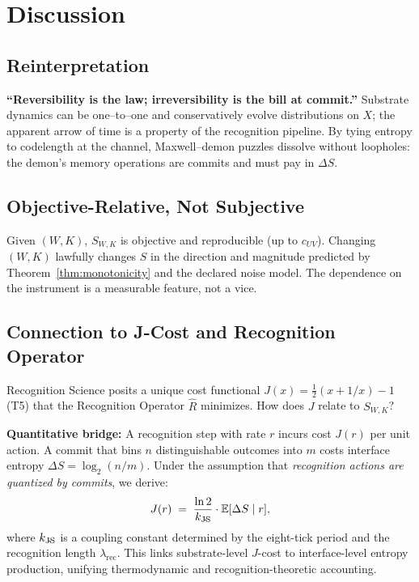 \documentclass[11pt,letterpaper]{article}
\theoremstyle{definition}
\theoremstyle{remark}
\begin{document}
\section{Discussion}

\subsection{Reinterpretation}

\textbf{``Reversibility is the law; irreversibility is the bill at commit.''} Substrate dynamics can be one--to--one and conservatively evolve distributions on \(X\); the apparent arrow of time is a property of the recognition pipeline. By tying entropy to codelength at the channel, Maxwell--demon puzzles dissolve without loopholes: the demon's memory operations are commits and must pay in \(\Delta S\).

\subsection{Objective-Relative, Not Subjective}

Given \((W,K)\), \(S_{W,K}\) is objective and reproducible (up to \(c_{UV}\)). Changing \((W,K)\) lawfully changes \(S\) in the direction and magnitude predicted by Theorem~\ref{thm:monotonicity} and the declared noise model. The dependence on the instrument is a measurable feature, not a vice.

\subsection{Connection to J-Cost and Recognition Operator}

Recognition Science posits a unique cost functional \(J(x)=\tfrac{1}{2}(x+1/x)-1\) (T5) that the Recognition Operator \(\widehat{R}\) minimizes. How does \(J\) relate to \(S_{W,K}\)?

\textbf{Quantitative bridge:} A recognition step with rate \(r\) incurs cost \(J(r)\) per unit action. A commit that bins \(n\) distinguishable outcomes into \(m\) costs interface entropy \(\Delta S = \log_2(n/m)\). Under the assumption that \emph{recognition actions are quantized by commits}, we derive:
\begin{equation}\label{eq:J_S_bridge}
J(r) \;=\; \frac{\ln 2}{k_{\text{J\!-\!S}}} \cdot \mathbb{E}[\Delta S\mid r],
\end{equation}
where \(k_{\text{J\!-\!S}}\) is a coupling constant determined by the eight-tick period and the recognition length \(\lambda_{\text{rec}}\). This links substrate-level \(J\)-cost to interface-level entropy production, unifying thermodynamic and recognition-theoretic accounting.
\end{document}
